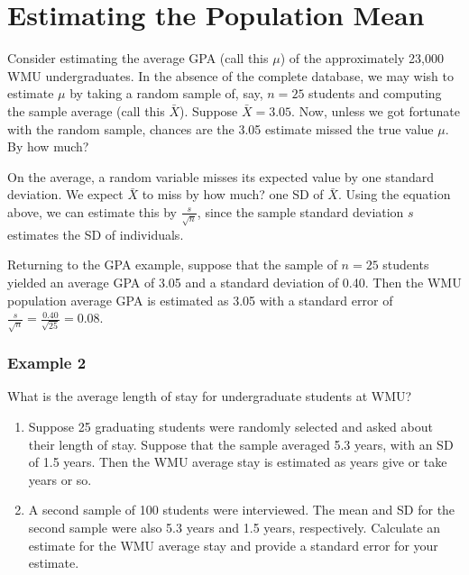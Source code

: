 \documentclass[11pt]{book}\usepackage[]{graphicx}\usepackage[]{color}
\begin{document}
\section{Estimating the Population Mean}

Consider estimating the average GPA (call this $\mu$) of the approximately 23,000 WMU undergraduates.  In the absence of the complete database, we may wish to estimate $\mu$ by taking a random sample of, say, $n = 25$ students and computing the sample average (call this $\bar{X}$).  Suppose $\bar{X} = 3.05$.  Now, unless we got fortunate with the random sample, chances are the 3.05 estimate missed the true value $\mu$.  By how much?

On the average, a random variable misses its expected value by one standard deviation.  We expect $\bar{X}$ to miss by how much?  one SD of $\bar{X}$.  Using the equation above, we can estimate this by $\frac{s}{\sqrt{n}}$, since the sample standard deviation $s$ estimates the SD of individuals.


Returning to the GPA example, suppose that the sample of $n = 25$ students yielded an average GPA of 3.05 and a standard deviation of 0.40.  Then the WMU population average GPA is estimated as 3.05 with a standard error of $\frac{s}{\sqrt{n}} = \frac{0.40}{\sqrt{25}} = 0.08$.

\subsubsection{Example 2}

What is the average length of stay for undergraduate students at WMU?

\begin{enumerate}
  \item Suppose 25 graduating students were randomly selected and asked about their length of stay.  Suppose that the sample averaged 5.3 years, with an SD of 1.5 years.  Then the WMU average stay is estimated as \underline{\phantom{xxxxxxxx}}  years give or take \underline{\phantom{xxxxxxxx}} years or so. 

  \item A second sample of 100 students were interviewed.   The mean and SD for the second sample were also 5.3 years and 1.5 years, respectively. Calculate an estimate for the WMU average stay and provide a standard error for your estimate.
\end{enumerate}
\end{document}
